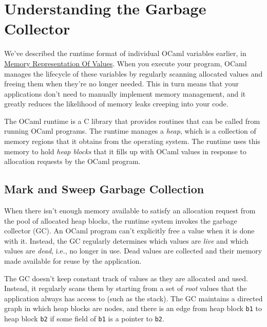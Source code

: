 \hypertarget{understanding-the-garbage-collector}{%
\section{Understanding the Garbage
Collector}\label{understanding-the-garbage-collector}}

We've described the runtime format of individual OCaml variables
earlier, in
\href{runtime-memory-layout.html\#memory-representation-of-values}{Memory
Representation Of Values}. When you execute your program, OCaml manages
the lifecycle of these variables by regularly scanning allocated values
and freeing them when they're no longer needed. This in turn means that
your applications don't need to manually implement memory management,
and it greatly reduces the likelihood of memory leaks creeping into your
code. 

The OCaml runtime is a C library that provides routines that can be
called from running OCaml programs. The runtime manages a \emph{heap},
which is a collection of memory regions that it obtains from the
operating system. The runtime uses this memory to hold \emph{heap
blocks} that it fills up with OCaml values in response to allocation
requests by the OCaml program.

\hypertarget{mark-and-sweep-garbage-collection}{%
\subsection{Mark and Sweep Garbage
Collection}\label{mark-and-sweep-garbage-collection}}

When there isn't enough memory available to satisfy an allocation
request from the pool of allocated heap blocks, the runtime system
invokes the garbage collector (GC). An OCaml program can't explicitly
free a value when it is done with it. Instead, the GC regularly
determines which values are \emph{live} and which values are
\emph{dead}, i.e., no longer in use. Dead values are collected and their
memory made available for reuse by the application. 

The GC doesn't keep constant track of values as they are allocated and
used. Instead, it regularly scans them by starting from a set of
\emph{root} values that the application always has access to (such as
the stack). The GC maintains a directed graph in which heap blocks are
nodes, and there is an edge from heap block \passthrough{\lstinline!b1!}
to heap block \passthrough{\lstinline!b2!} if some field of
\passthrough{\lstinline!b1!} is a pointer to
\passthrough{\lstinline!b2!}.

